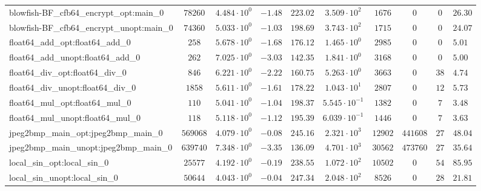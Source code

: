\begin{tabular}{|l|c|HHc|c|c|c|cH|}
blowfish-BF\_cfb64\_encrypt\_opt:main\_0        & $ 78260    $ & $ 4.484 \cdot 10^{0} $ & $ -1.48 $ & $ 223.02 $ & $ 3.509 \cdot 10^{2}  $ & $ 1676   $ & $ 0       $ & $ 0   $ & $ 26.30   $ \\
blowfish-BF\_cfb64\_encrypt\_unopt:main\_0      & $ 74360    $ & $ 5.033 \cdot 10^{0} $ & $ -1.03 $ & $ 198.69 $ & $ 3.743 \cdot 10^{2}  $ & $ 1715   $ & $ 0       $ & $ 0   $ & $ 24.07   $ \\
float64\_add\_opt:float64\_add\_0               & $ 258      $ & $ 5.678 \cdot 10^{0} $ & $ -1.68 $ & $ 176.12 $ & $ 1.465 \cdot 10^{0}  $ & $ 2985   $ & $ 0       $ & $ 0   $ & $ 5.01    $ \\
float64\_add\_unopt:float64\_add\_0             & $ 262      $ & $ 7.025 \cdot 10^{0} $ & $ -3.03 $ & $ 142.35 $ & $ 1.841 \cdot 10^{0}  $ & $ 3168   $ & $ 0       $ & $ 0   $ & $ 5.00    $ \\
float64\_div\_opt:float64\_div\_0               & $ 846      $ & $ 6.221 \cdot 10^{0} $ & $ -2.22 $ & $ 160.75 $ & $ 5.263 \cdot 10^{0}  $ & $ 3663   $ & $ 0       $ & $ 38  $ & $ 4.74    $ \\
float64\_div\_unopt:float64\_div\_0             & $ 1858     $ & $ 5.611 \cdot 10^{0} $ & $ -1.61 $ & $ 178.22 $ & $ 1.043 \cdot 10^{1}  $ & $ 2807   $ & $ 0       $ & $ 12  $ & $ 5.73    $ \\
float64\_mul\_opt:float64\_mul\_0               & $ 110      $ & $ 5.041 \cdot 10^{0} $ & $ -1.04 $ & $ 198.37 $ & $ 5.545 \cdot 10^{-1} $ & $ 1382   $ & $ 0       $ & $ 7   $ & $ 3.48    $ \\
float64\_mul\_unopt:float64\_mul\_0             & $ 118      $ & $ 5.118 \cdot 10^{0} $ & $ -1.12 $ & $ 195.39 $ & $ 6.039 \cdot 10^{-1} $ & $ 1446   $ & $ 0       $ & $ 7   $ & $ 3.63    $ \\
jpeg2bmp\_main\_opt:jpeg2bmp\_main\_0           & $ 569068   $ & $ 4.079 \cdot 10^{0} $ & $ -0.08 $ & $ 245.16 $ & $ 2.321 \cdot 10^{3}  $ & $ 12902  $ & $ 441608  $ & $ 27  $ & $ 48.04   $ \\
jpeg2bmp\_main\_unopt:jpeg2bmp\_main\_0         & $ 639740   $ & $ 7.348 \cdot 10^{0} $ & $ -3.35 $ & $ 136.09 $ & $ 4.701 \cdot 10^{3}  $ & $ 30562  $ & $ 473760  $ & $ 27  $ & $ 35.64   $ \\
local\_sin\_opt:local\_sin\_0                   & $ 25577    $ & $ 4.192 \cdot 10^{0} $ & $ -0.19 $ & $ 238.55 $ & $ 1.072 \cdot 10^{2}  $ & $ 10502  $ & $ 0       $ & $ 54  $ & $ 85.95   $ \\
local\_sin\_unopt:local\_sin\_0                 & $ 50644    $ & $ 4.043 \cdot 10^{0} $ & $ -0.04 $ & $ 247.34 $ & $ 2.048 \cdot 10^{2}  $ & $ 8526   $ & $ 0       $ & $ 28  $ & $ 21.81   $ \\

\end{tabular}
